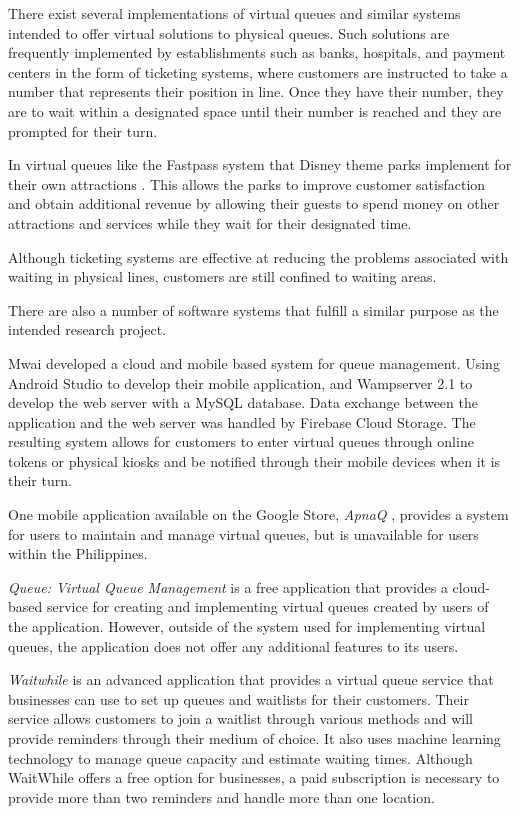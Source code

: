 There exist several implementations of virtual queues and similar systems intended to offer virtual solutions to physical queues. Such solutions are frequently implemented by establishments such as banks, hospitals, and payment centers in the form of ticketing systems, where customers are instructed to take a number that represents their position in line. Once they have their number, they are to wait within a designated space until their number is reached and they are prompted for their turn. 

In virtual queues like the Fastpass system that Disney theme parks implement for their own attractions \cite{cope2011innovative}. This allows the parks to improve customer satisfaction and obtain additional revenue by allowing their guests to spend money on other attractions and services while they wait for their designated time.

Although ticketing systems are effective at reducing the problems associated with waiting in physical lines, customers are still confined to waiting areas. 

There are also a number of software systems that fulfill a similar purpose as the intended research project. 

	Mwai \citeyear{mwaivirtual} developed a cloud and mobile based system for queue management. Using Android Studio to develop their mobile application, and Wampserver 2.1 to develop the web server with a MySQL database. Data exchange between the application and the web server was handled by Firebase Cloud Storage. The resulting system allows for customers to enter virtual queues through online tokens or physical kiosks and be notified through their mobile devices when it is their turn.

One mobile application available on the Google Store, \textit{ApnaQ} \citeyear{appnaq}, provides a system for users to maintain and manage virtual queues, but is unavailable for users within the Philippines. 

\textit{Queue: Virtual Queue Management} \citeyear{virtualqueueapp} is a free application that provides a cloud-based service for creating and implementing virtual queues created by users of the application. However, outside of the system used for implementing virtual queues, the application does not offer any additional features to its users. 

\textit{Waitwhile} \citeyear{waitwhile} is an advanced application that provides a virtual queue service that businesses can use to set up queues and waitlists for their customers. Their service allows customers to join a waitlist through various methods and will provide reminders through their medium of choice. It also uses machine learning technology to manage queue capacity and estimate waiting times. Although WaitWhile offers a free option for businesses, a paid subscription is necessary to provide more than two reminders and handle more than one location. 

